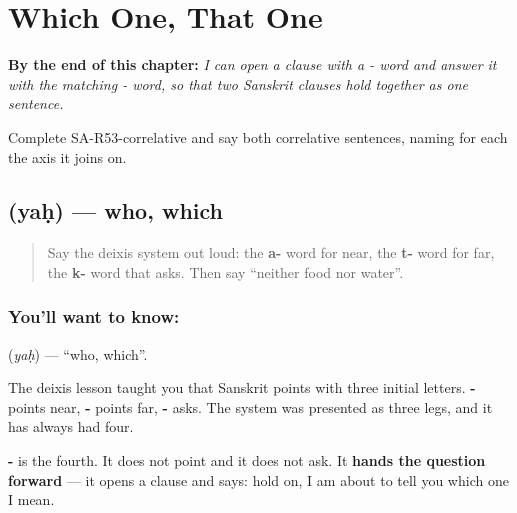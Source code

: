 
\chapter{Which One, That One}
\label{ch:sa-which-one-that-one}

\begin{chapteropening}
\textbf{By the end of this chapter:} \emph{I can open a clause with a - word and answer it with the matching - word, so that two Sanskrit clauses hold together as one sentence.}

Complete SA-R53-correlative and say both correlative sentences, naming for each the axis it joins on.
\end{chapteropening}

\section[\texorpdfstring{\sk{यः} (yaḥ)}{यः (yaḥ)}]{ (yaḥ) — who, which}

\label{lesson:SA-C53-yah}



\begin{quote}
Say the deixis system out loud: the \textbf{a-} word for near, the \textbf{t-} word for far, the \textbf{k-} word that asks. Then say \textquotedblleft{}neither food nor water\textquotedblright{}.
\end{quote}

\subsection*{You'll want to know: }
\textbf{} (\emph{yaḥ}) — \textquotedblleft{}who, which\textquotedblright{}.

The deixis lesson taught you that Sanskrit points with three initial letters. \textbf{-} points near, \textbf{-} points far, \textbf{-} asks. The system was presented as three legs, and it has always had four.

\textbf{-} is the fourth. It does not point and it does not ask. It \textbf{hands the question forward} — it opens a clause and says: hold on, I am about to tell you which one I mean.

